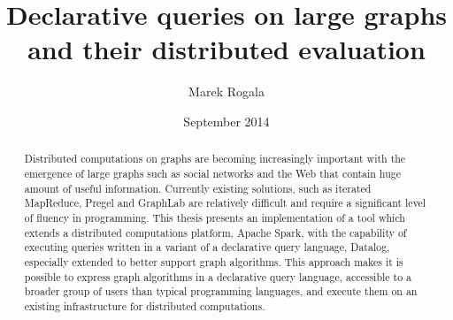 \documentclass{pracamgr}
\author{Marek Rogala}
\title{Declarative queries on large graphs and their distributed evaluation}
\date{September 2014}
\theoremstyle{plain}
\theoremstyle{definition}
\theoremstyle{remark}
\begin{document}
\maketitle

\begin{abstract}
Distributed computations on graphs are becoming increasingly important with the emergence of large graphs such as social networks and the Web that contain huge amount of useful information.
Currently existing solutions, such as iterated MapReduce, Pregel and GraphLab are relatively difficult and require a significant level of fluency in programming.
This thesis presents an implementation of a tool which extends a distributed computations platform, Apache Spark, with the capability of executing queries written in a variant of a declarative query language, Datalog, especially extended to better support graph algorithms.
This approach makes it is possible to express graph algorithms in a declarative query language, accessible to a broader group of users than typical programming languages, and execute them on an existing infrastructure for distributed computations.
\end{abstract}

\tableofcontents
















%
\end{document}
